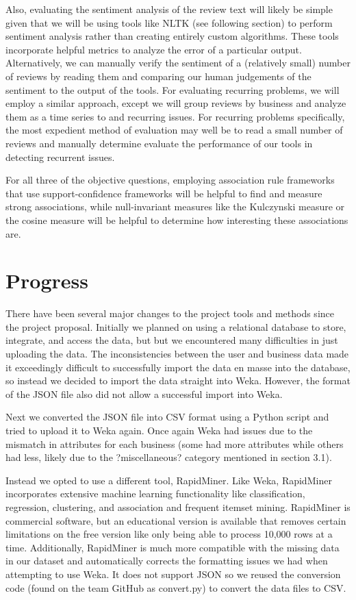 \quad Also, evaluating the sentiment analysis of the review text will likely be simple given that we will be using tools like NLTK (see following section) to perform sentiment analysis rather than creating entirely custom algorithms. These tools incorporate helpful metrics to analyze the error of a particular output. Alternatively, we can manually verify the sentiment of a (relatively small) number of reviews by reading them and comparing our human judgements of the sentiment to the output of the tools. For evaluating recurring problems, we will employ a similar approach, except we will group reviews by business and analyze them as a time series to and recurring issues. For recurring problems specifically, the most expedient method of evaluation may well be to read a small number of reviews and manually determine evaluate the performance of our tools in detecting recurrent issues.

\quad For all three of the objective questions, employing association rule frameworks that use support-confidence frameworks will be helpful to find and measure strong associations, while null-invariant measures like the Kulczynski measure or the cosine measure will be helpful to determine how interesting these associations are.

\section{Progress}

There have been several major changes to the project tools and methods since the project proposal. Initially we planned on using a relational database to store, integrate, and access the data, but but we encountered many difficulties in just uploading the data. The inconsistencies between the user and business data made it exceedingly difficult to successfully import the data en masse into the database, so instead we decided to import the data straight into Weka. However, the format of the JSON file also did not allow a successful import into Weka. 

\quad Next we converted the JSON file into CSV format using a Python script and tried to upload it to Weka again. Once again Weka had issues due to the mismatch in attributes for each business (some had more attributes while others had less, likely due to the ?miscellaneous? category mentioned in section 3.1).

\quad Instead we opted to use a different tool, RapidMiner. Like Weka, RapidMiner incorporates extensive machine learning functionality like classification, regression, clustering, and association and frequent itemset mining. RapidMiner is commercial software, but an educational version is available that removes certain limitations on the free version like only being able to process 10,000 rows at a time. Additionally, RapidMiner is much more compatible with the missing data in our dataset and automatically corrects the formatting issues we had when attempting to use Weka. It does not support JSON so we reused the conversion code (found on the team GitHub as convert.py) to convert the data files to CSV. 

